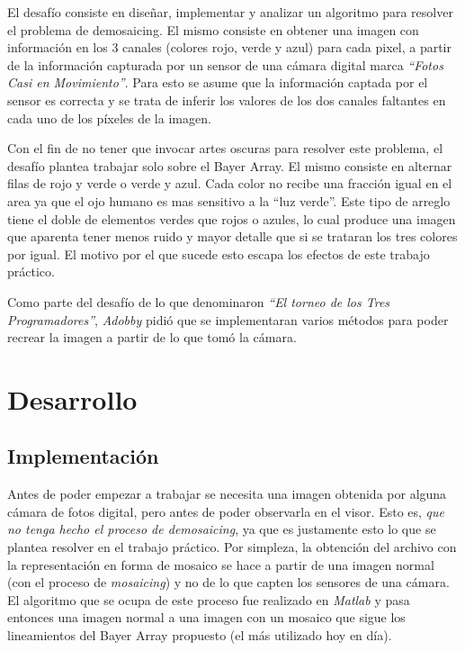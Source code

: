 \par 
El desafío consiste en diseñar, implementar y analizar un algoritmo para resolver el
problema de demosaicing. El mismo consiste en obtener una imagen con información en los 3 canales (colores rojo, verde y azul) para cada pixel, a partir de la información capturada por un sensor de una cámara digital marca \textit{``Fotos Casi en Movimiento''}. Para esto se asume que la información captada por el sensor es
correcta y se trata de inferir los valores de los dos canales faltantes en cada uno de los píxeles de la imagen.
\par 
Con el fin de no tener que invocar artes oscuras para resolver este problema, el desafío plantea trabajar solo sobre el Bayer Array. El mismo consiste en alternar filas de rojo y verde o verde y azul. Cada color no recibe una fracción igual en el area ya que el ojo humano es mas sensitivo a la ``luz verde''. Este tipo de arreglo tiene el doble de elementos verdes que rojos o azules, lo cual produce una imagen que aparenta tener menos ruido y mayor detalle que si se trataran los tres colores por igual. El motivo por el que sucede esto escapa los efectos de este trabajo práctico.
\par 
Como parte del desafío de lo que denominaron \textit{``El torneo de los Tres Programadores''}, \textit{Adobby} pidió que se implementaran varios métodos para poder recrear la imagen a partir de lo que tomó la cámara.

\newpage

\section{Desarrollo}

\subsection{Implementación}

Antes de poder empezar a trabajar se necesita una imagen obtenida por alguna cámara de fotos digital, pero antes de poder observarla en el visor. Esto es, \textit{que no tenga hecho el proceso de demosaicing}, ya que es justamente esto lo que se plantea resolver en el trabajo práctico. Por simpleza, la obtención del archivo con la representación en forma de mosaico se hace a partir de una imagen normal (con el proceso de \textit{mosaicing}) y no de lo que capten los sensores de una cámara. El algoritmo que se ocupa de este proceso fue realizado en \textit{Matlab} y pasa entonces una imagen normal a una imagen con un mosaico que sigue los lineamientos del Bayer Array propuesto (el más utilizado hoy en día).

